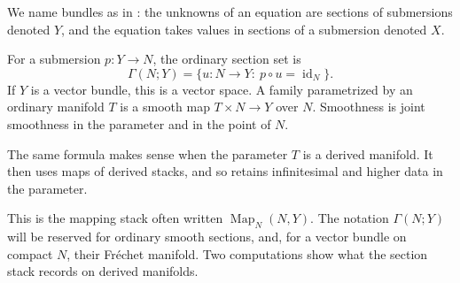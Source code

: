 We name bundles as in \citet[Section~3.4]{Steffens_Representability_Elliptic_Moduli}:
the unknowns of an equation are sections of submersions denoted $Y$,
and the equation takes values in sections of a submersion denoted $X$.

For a submersion $p\colon Y\to N$, the ordinary section set is
\[
 \Gamma(N;Y)=\{u\colon N\to Y:\ p\circ u=\operatorname{id}_N\}.
\]
If $Y$ is a vector bundle, this is a vector space.
A family parametrized by an ordinary manifold $T$ is a smooth map
$T\times N\to Y$ over $N$. Smoothness is joint smoothness in the
parameter and in the point of $N$.

The same formula makes sense when the parameter $T$ is a derived
manifold. It then uses maps of derived stacks, and so retains
infinitesimal and higher data in the parameter.


This is the mapping stack often written $\operatorname{Map}_N(N,Y)$.
The notation $\Gamma(N;Y)$ will be reserved for ordinary smooth
sections, and, for a vector bundle on compact $N$, their Fr\'echet
manifold. Two computations show what the section stack records on
derived manifolds.


